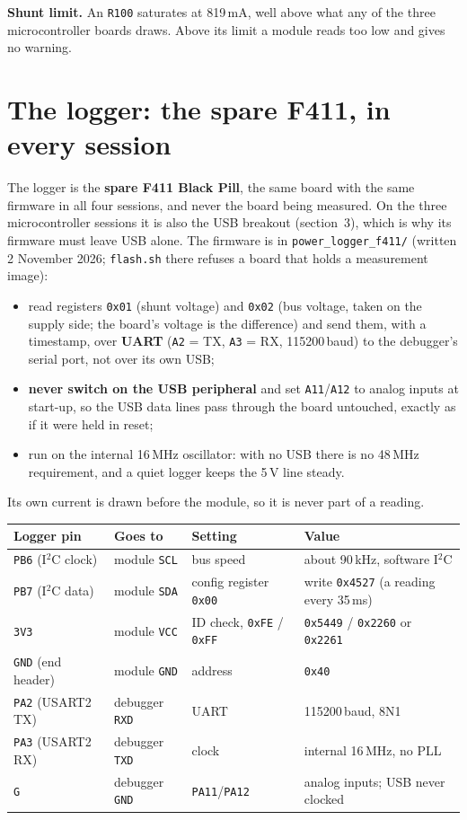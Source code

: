 \documentclass[11pt]{article}
\newcommand{\code}[1]{\texttt{#1}}
\begin{document}
\textbf{Shunt limit.} An \code{R100} saturates at 819\,mA, well above what any of the three
microcontroller boards draws. Above its limit a module reads too low and gives no warning.

\section{The logger: the spare F411, in every session}

The logger is the \textbf{spare F411 Black Pill}, the same board with the same firmware in all
four sessions, and never the board being measured. On the three microcontroller sessions it is
also the USB breakout (section~3), which is why its firmware must leave USB alone. The firmware
is in \code{power\_logger\_f411/} (written 2 November 2026; \code{flash.sh} there refuses a board that holds a measurement image):
\begin{itemize}
\item read registers \code{0x01} (shunt voltage) and \code{0x02} (bus voltage, taken on the supply
side; the board's voltage is the difference) and send them,
with a timestamp, over \textbf{UART} (\code{A2} = TX, \code{A3} = RX, 115200\,baud) to the
debugger's serial port, not over its own USB;
\item \textbf{never switch on the USB peripheral} and set \code{A11}/\code{A12} to analog
inputs at start-up, so the USB data lines pass through the board untouched, exactly as if it
were held in reset;
\item run on the internal 16\,MHz oscillator: with no USB there is no 48\,MHz requirement, and a
quiet logger keeps the 5\,V line steady.
\end{itemize}
Its own current is drawn before the module, so it is never part of a reading.

\begin{center}
\small
\begin{tabular}{@{}ll@{\hspace{3em}}ll@{}}
\toprule
\textbf{Logger pin} & \textbf{Goes to} & \textbf{Setting} & \textbf{Value}\\
\midrule
\code{PB6} (I$^2$C clock) & module \code{SCL} & bus speed & about 90\,kHz, software I$^2$C\\
\code{PB7} (I$^2$C data)  & module \code{SDA} & config register \code{0x00} & write \code{0x4527} (a reading every 35\,ms)\\
\code{3V3} & module \code{VCC} & ID check, \code{0xFE} / \code{0xFF} & \code{0x5449} / \code{0x2260} or \code{0x2261}\\
\code{GND} (end header) & module \code{GND} & address & \code{0x40}\\
\code{PA2} (USART2 TX) & debugger \code{RXD} & UART & 115200\,baud, 8N1\\
\code{PA3} (USART2 RX) & debugger \code{TXD} & clock & internal 16\,MHz, no PLL\\
\code{G} & debugger \code{GND} & \code{PA11}/\code{PA12} & analog inputs; USB never clocked\\
\bottomrule
\end{tabular}
\end{center}
\end{document}
